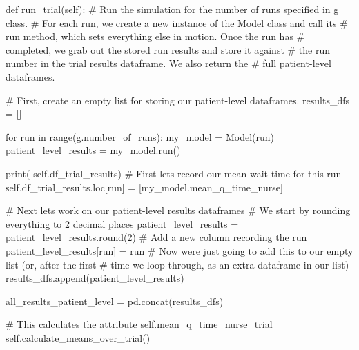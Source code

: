 \documentclass[
  letterpaper,
  DIV=11,
  numbers=noendperiod]{scrreprt}
\newenvironment{Shaded}{\begin{snugshade}}{\end{snugshade}}
\newcommand{\BuiltInTok}[1]{\textcolor[rgb]{0.00,0.23,0.31}{#1}}
\newcommand{\CommentTok}[1]{\textcolor[rgb]{0.37,0.37,0.37}{#1}}
\newcommand{\ControlFlowTok}[1]{\textcolor[rgb]{0.00,0.23,0.31}{#1}}
\newcommand{\DecValTok}[1]{\textcolor[rgb]{0.68,0.00,0.00}{#1}}
\newcommand{\KeywordTok}[1]{\textcolor[rgb]{0.00,0.23,0.31}{#1}}
\newcommand{\NormalTok}[1]{\textcolor[rgb]{0.00,0.23,0.31}{#1}}
\newcommand{\OperatorTok}[1]{\textcolor[rgb]{0.37,0.37,0.37}{#1}}
\newcommand{\StringTok}[1]{\textcolor[rgb]{0.13,0.47,0.30}{#1}}
\newcommand{\VariableTok}[1]{\textcolor[rgb]{0.07,0.07,0.07}{#1}}
\begin{document}
\begin{tcolorbox}
\begin{Shaded}
\begin{Highlighting}[]
    \KeywordTok{def}\NormalTok{ run\_trial(}\VariableTok{self}\NormalTok{):}
        \CommentTok{\# Run the simulation for the number of runs specified in g class.}
        \CommentTok{\# For each run, we create a new instance of the Model class and call its}
        \CommentTok{\# run method, which sets everything else in motion.  Once the run has}
        \CommentTok{\# completed, we grab out the stored run results and store it against}
        \CommentTok{\# the run number in the trial results dataframe. We also return the}
        \CommentTok{\# full patient{-}level dataframes.}

        \CommentTok{\# First, create an empty list for storing our patient{-}level dataframes.}
\NormalTok{        results\_dfs }\OperatorTok{=}\NormalTok{ []}

        \ControlFlowTok{for}\NormalTok{ run }\KeywordTok{in} \BuiltInTok{range}\NormalTok{(g.number\_of\_runs):}
\NormalTok{            my\_model }\OperatorTok{=}\NormalTok{ Model(run)}
\NormalTok{            patient\_level\_results }\OperatorTok{=}\NormalTok{ my\_model.run()}

            \BuiltInTok{print}\NormalTok{( }\VariableTok{self}\NormalTok{.df\_trial\_results)}
            \CommentTok{\# First let\textquotesingle{}s record our mean wait time for this run}
            \VariableTok{self}\NormalTok{.df\_trial\_results.loc[run] }\OperatorTok{=}\NormalTok{ [my\_model.mean\_q\_time\_nurse]}

            \CommentTok{\# Next let\textquotesingle{}s work on our patient{-}level results dataframes}
            \CommentTok{\# We start by rounding everything to 2 decimal places}
\NormalTok{            patient\_level\_results }\OperatorTok{=}\NormalTok{ patient\_level\_results.}\BuiltInTok{round}\NormalTok{(}\DecValTok{2}\NormalTok{)}
            \CommentTok{\# Add a new column recording the run}
\NormalTok{            patient\_level\_results[}\StringTok{\textquotesingle{}run\textquotesingle{}}\NormalTok{] }\OperatorTok{=}\NormalTok{ run}
            \CommentTok{\# Now we\textquotesingle{}re just going to add this to our empty list (or, after the first}
            \CommentTok{\# time we loop through, as an extra dataframe in our list)}
\NormalTok{            results\_dfs.append(patient\_level\_results)}

\NormalTok{        all\_results\_patient\_level }\OperatorTok{=}\NormalTok{ pd.concat(results\_dfs)}

        \CommentTok{\# This calculates the attribute self.mean\_q\_time\_nurse\_trial}
        \VariableTok{self}\NormalTok{.calculate\_means\_over\_trial()}


\end{Highlighting}
\end{Shaded}
\end{tcolorbox}
\end{document}

